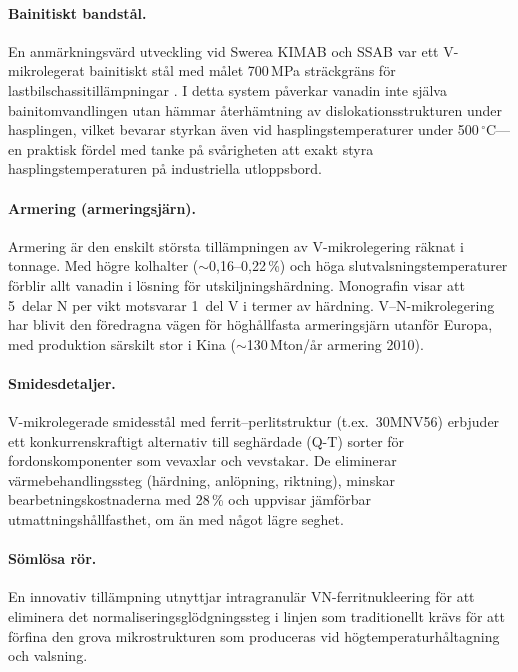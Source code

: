 \documentclass[11pt,a4paper]{article}
\begin{document}
\paragraph{Bainitiskt bandst\aa{}l.}  En anm\"arkningsv\"ard utveckling
vid Swerea KIMAB och SSAB var ett V-mikrolegerat bainitiskt st\aa{}l med
m\aa{}let 700\,MPa str\"ackgr\"ans f\"or lastbilschassitill\"ampningar
\cite{Hutchinson2014Bainite}.  I detta system p\aa{}verkar vanadin inte
sj\"alva bainitomvandlingen utan h\"ammar \aa{}terh\"amtning av
dislokationsstrukturen under hasplingen, vilket bevarar styrkan \"aven
vid hasplingstemperaturer under 500\,${}^\circ$C---en praktisk f\"ordel
med tanke p\aa{} sv\aa{}righeten att exakt styra hasplingstemperaturen
p\aa{} industriella utloppsbord.

\paragraph{Armering (armeringsj\"arn).}  Armering \"ar den enskilt
st\"orsta till\"ampningen av V-mikrolegering r\"aknat i tonnage.  Med
h\"ogre kolhalter ($\sim$0,16--0,22\,\%) och h\"oga
slutvalsningstemperaturer f\"orblir allt vanadin i l\"osning f\"or
utskiljningsh\"ardning.  Monografin visar att 5~delar N per vikt
motsvarar 1~del V i termer av h\"ardning.  V--N-mikrolegering har blivit
den f\"oredragna v\"agen f\"or h\"ogh\aa{}llfasta armeringsj\"arn utanf\"or
Europa, med produktion s\"arskilt stor i Kina ($\sim$130\,Mton/\aa{}r
armering 2010).

\paragraph{Smidesdetaljer.}  V-mikrolegerade smidesst\aa{}l med
ferrit--perlitstruktur (t.ex.\ 30MNV56) erbjuder ett konkurrenskraftigt
alternativ till segh\"ardade (Q-T) sorter f\"or fordonskomponenter som
vevaxlar och vevstakar.  De eliminerar v\"armebehandlingssteg
(h\"ardning, anl\"opning, riktning), minskar bearbetningskostnaderna med
28\,\% och uppvisar j\"amf\"orbar utmattningsh\aa{}llfasthet, om \"an med
n\aa{}got l\"agre seghet.

\paragraph{S\"oml\"osa r\"or.}  En innovativ till\"ampning utnyttjar
intragranul\"ar VN-ferritnukleering f\"or att eliminera det
normaliseringsgl\"odgningssteg i linjen som traditionellt kr\"avs f\"or
att f\"orfina den grova mikrostrukturen som produceras vid
h\"ogtemperaturh\aa{}ltagning och valsning.
\end{document}
